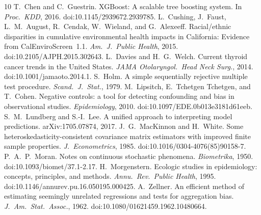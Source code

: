 \documentclass[11pt]{article}
\begin{document}

\begin{thebibliography}{10}
 T.~Chen and C.~Guestrin. XGBoost: A scalable tree boosting system. In \emph{Proc.\ KDD}, 2016. doi:10.1145/2939672.2939785.
 L.~Cushing, J.~Faust, L.~M.~August, R.~Cendak, W.~Wieland, and G.~Alexeeff. Racial/ethnic disparities in cumulative environmental health impacts in California: Evidence from CalEnviroScreen~1.1. \emph{Am.\ J.\ Public Health}, 2015. doi:10.2105/AJPH.2015.302643.
 L.~Davies and H.~G.~Welch. Current thyroid cancer trends in the United States. \emph{JAMA Otolaryngol.\ Head Neck Surg.}, 2014. doi:10.1001/jamaoto.2014.1.
 S.~Holm. A simple sequentially rejective multiple test procedure. \emph{Scand.\ J.\ Stat.}, 1979.
 M.~Lipsitch, E.~Tchetgen Tchetgen, and T.~Cohen. Negative controls: a tool for detecting confounding and bias in observational studies. \emph{Epidemiology}, 2010. doi:10.1097/EDE.0b013e3181d61eeb.
 S.~M.~Lundberg and S.-I.~Lee. A unified approach to interpreting model predictions. arXiv:1705.07874, 2017.
 J.~G.~MacKinnon and H.~White. Some heteroskedasticity-consistent covariance matrix estimators with improved finite sample properties. \emph{J.\ Econometrics}, 1985. doi:10.1016/0304-4076(85)90158-7.
 P.~A.~P.~Moran. Notes on continuous stochastic phenomena. \emph{Biometrika}, 1950. doi:10.1093/biomet/37.1-2.17.
 H.~Morgenstern. Ecologic studies in epidemiology: concepts, principles, and methods. \emph{Annu.\ Rev.\ Public Health}, 1995. doi:10.1146/annurev.pu.16.050195.000425.
 A.~Zellner. An efficient method of estimating seemingly unrelated regressions and tests for aggregation bias. \emph{J.\ Am.\ Stat.\ Assoc.}, 1962. doi:10.1080/01621459.1962.10480664.
\end{thebibliography}
\end{document}
